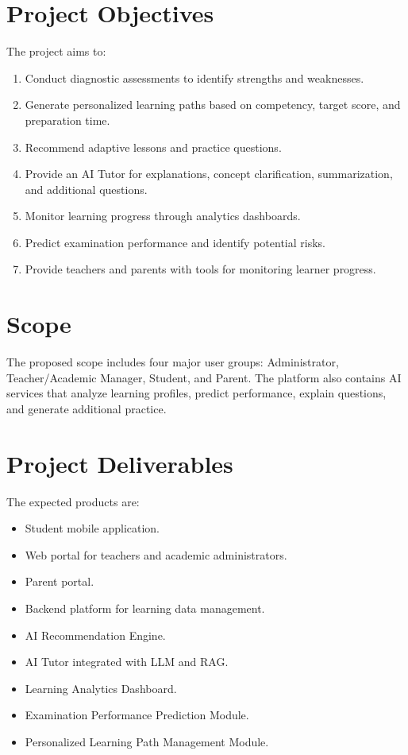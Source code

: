 \documentclass[12pt,a4paper]{report}
\begin{document}
\section{Project Objectives}

The project aims to:

\begin{enumerate}
    \item Conduct diagnostic assessments to identify strengths and weaknesses.
    \item Generate personalized learning paths based on competency, target score, and preparation time.
    \item Recommend adaptive lessons and practice questions.
    \item Provide an AI Tutor for explanations, concept clarification, summarization, and additional questions.
    \item Monitor learning progress through analytics dashboards.
    \item Predict examination performance and identify potential risks.
    \item Provide teachers and parents with tools for monitoring learner progress.
\end{enumerate}

\section{Scope}

The proposed scope includes four major user groups: Administrator, Teacher/Academic Manager, Student, and Parent. The platform also contains AI services that analyze learning profiles, predict performance, explain questions, and generate additional practice.

\section{Project Deliverables}

The expected products are:

\begin{itemize}
    \item Student mobile application.
    \item Web portal for teachers and academic administrators.
    \item Parent portal.
    \item Backend platform for learning data management.
    \item AI Recommendation Engine.
    \item AI Tutor integrated with LLM and RAG.
    \item Learning Analytics Dashboard.
    \item Examination Performance Prediction Module.
    \item Personalized Learning Path Management Module.
\end{itemize}
\end{document}
